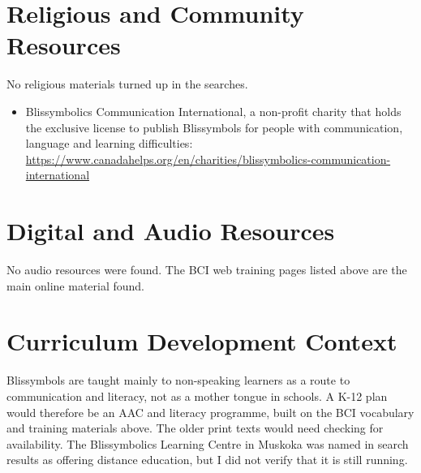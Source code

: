 \documentclass[12pt]{article}
\begin{document}
\section{Religious and Community Resources}
No religious materials turned up in the searches.
\begin{itemize}
\item Blissymbolics Communication International, a non-profit charity that holds the exclusive license to publish Blissymbols for people with communication, language and learning difficulties: \url{https://www.canadahelps.org/en/charities/blissymbolics-communication-international}
\end{itemize}

\section{Digital and Audio Resources}
No audio resources were found. The BCI web training pages listed above are the main online material found.

\section{Curriculum Development Context}
Blissymbols are taught mainly to non-speaking learners as a route to communication and literacy, not as a mother tongue in schools. A K-12 plan would therefore be an AAC and literacy programme, built on the BCI vocabulary and training materials above. The older print texts would need checking for availability. The Blissymbolics Learning Centre in Muskoka was named in search results as offering distance education, but I did not verify that it is still running.
\end{document}
